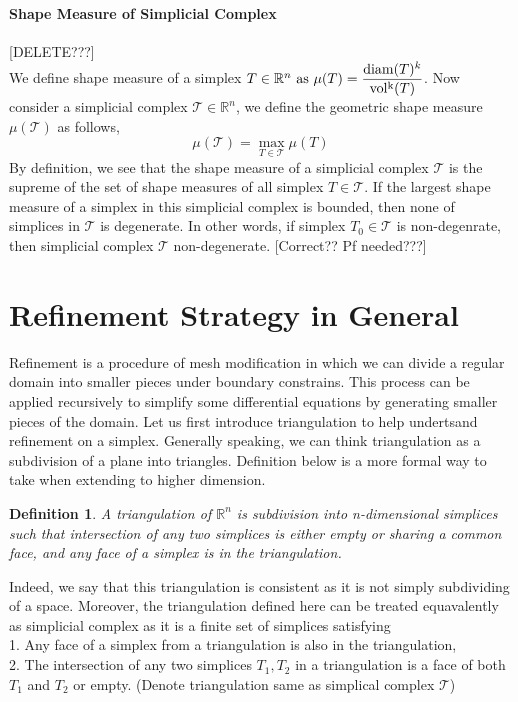 \documentclass{article}
\newtheorem*{definition*}{Definition}
\begin{document}
    \paragraph{Shape Measure of Simplicial Complex}[DELETE???]\mbox{}\\
    We define shape measure of a simplex \(T \in\mathbb{R}^n$ as $\mu({{T}}) = \displaystyle \frac{\operatorname{diam}({T})^k}{\operatorname{vol^k}({T})}\). Now consider a simplicial complex $\mathcal{T}\in\mathbb{R}^n$, we define the geometric shape measure $\mu(\mathcal{T})$ as follows,
    \begin{equation*}
    \mu(\mathcal{T}) = \max_{T \in \mathcal{T}} \mu(T)
    \end{equation*}
    By definition, we see that the shape measure of a simplicial complex $\mathcal{T}$ is the supreme of the set of shape measures of all simplex $T\in\mathcal{T}$. If the largest shape measure of a simplex in this simplicial complex is bounded, then none of simplices in $\mathcal{T}$ is degenerate. In other words, if simplex $T_0 \in\mathcal{T}$ is non-degenrate, then simplicial complex $\mathcal{T}$ non-degenerate.
    [Correct?? Pf needed???]


    \section{Refinement Strategy in General}
    Refinement is a procedure of mesh modification in which we can divide a regular domain into smaller pieces under boundary constrains. This process can be applied recursively to simplify some differential equations by generating smaller pieces of the domain. Let us first introduce triangulation to help undertsand refinement on a simplex. Generally speaking, we can think triangulation as a subdivision of a plane into triangles. Definition below is a more formal way to take when extending to higher dimension.
    \begin{definition*}
    A triangulation of $\mathbb R^n$ is subdivision into n-dimensional simplices such that intersection of any two simplices is either empty or sharing a common face, and any face of a simplex is in the triangulation.
    \end{definition*}
    Indeed, we say that this triangulation is consistent as it is not simply subdividing of a space. Moreover, the triangulation defined here can be treated equavalently as simplicial complex as it is a finite set of simplices satisfying\\
    1. Any face of a simplex from a triangulation is also in the triangulation,\\
    2. The intersection of any two simplices ${T}_1, {T}_2 $ in a triangulation is a face of both ${T}_1$ and  ${T}_2$ or empty.
    (Denote triangulation same as simplical complex $\mathcal{T}$)\\
    
\end{document}
